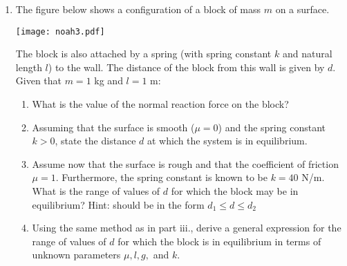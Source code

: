 {\begin{enumerate}
\item The figure below shows a configuration of a block of mass $m$ on a surface. 
            \begin{center}
                \texttt{[image: noah3.pdf]}
            \end{center}
The block is also attached by a spring (with spring constant $k$ and natural length $l$) to the wall. The distance of the block from this wall is given by $d$. Given that $m=1$ kg and $l=1$ m:
	\begin{enumerate}
	\item{ What is the value of the normal reaction force on the block? 
	}
	\item{Assuming that the surface is smooth ($\mu=0$) and the spring constant $k>0$, state the distance $d$ at which the system is in equilibrium. 
	}
	\item{Assume now that the surface is rough and that the coefficient of friction $\mu=1$. Furthermore, the spring constant is known to be $k=40$ N/m. What is the range of values of $d$ for which the block may be in equilibrium? Hint: should be in the form $d_1\leq d\leq d_2$ 
	}
    \item{Using the same method as in part iii., derive a general expression for the range of values of $d$ for which the block is in equilibrium in terms of unknown parameters $\mu,l,g,$ and $k$.
}
	\end{enumerate}	
\end{enumerate}

}

